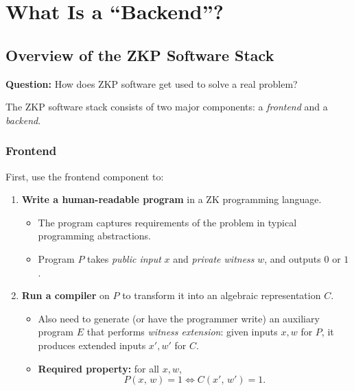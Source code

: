 \documentclass[11pt]{article}
\begin{document}
\section{What Is a ``Backend''?}

\subsection{Overview of the ZKP Software Stack}

\begin{tcolorbox}[colback=blue!5!white, colframe=blue!50!black, title={Central Question}]
  \textbf{Question:} How does ZKP software get used to solve a real problem?
\end{tcolorbox}

\medskip
The ZKP software stack consists of two major components: a \emph{frontend} and a \emph{backend}.

\subsubsection*{Frontend}

First, use the frontend component to:
\begin{enumerate}
  \item \textbf{Write a human-readable program} in a ZK programming language.
    \begin{itemize}
      \item The program captures requirements of the problem in typical programming abstractions.
      \item Program $P$ takes \emph{public input} $x$ and \emph{private witness} $w$, and outputs $0$ or $1$.
    \end{itemize}
  \item \textbf{Run a compiler} on $P$ to transform it into an algebraic representation $C$.
    \begin{itemize}
      \item Also need to generate (or have the programmer write) an auxiliary program $E$ that
            performs \emph{witness extension}: given inputs $x, w$ for $P$, it produces extended inputs
            $x', w'$ for $C$.
      \item \textbf{Required property:} for all $x, w$,
            \[
              P(x,\, w) = 1 \iff C(x',\, w') = 1.
            \]
    \end{itemize}
\end{enumerate}
\end{document}
